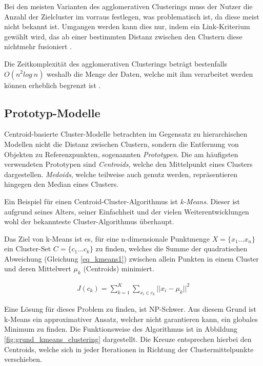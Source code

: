 Bei den meisten Varianten des agglomerativen Clusterings muss der Nutzer die Anzahl der Zielcluster im
vorraus festlegen, was problematisch ist, da diese meist nicht bekannt ist. Umgangen werden kann dies nur,
indem ein Link-Kriterium gewählt wird, das ab einer bestimmten Distanz zwischen den Clustern diese nichtmehr
fusioniert \cite[]{GeorgeSeif2018}.

Die Zeitkomplexität des agglomerativen Clusterings beträgt bestenfalls $O(n^2log\ n)$ weshalb die Menge der Daten,
welche mit ihm verarbeitet werden können erheblich begrenzt ist \cite[]{tan2007introduction}.

\subsection{Prototyp-Modelle}
\label{sec:grund_prototype_clustering}

Centroid-basierte Cluster-Modelle betrachten im Gegensatz zu hierarchischen Modellen nicht die Distanz
zwischen Clustern, sondern die Entfernung von Objekten zu Referenzpunkten, sogenannten \textit{Prototypen}.
Die am häufigsten verwendeten Prototypen sind \textit{Centroids}, welche den Mittelpunkt eines Clusters dargestellen.
\textit{Medoids}, welche teilweise auch genutz werden, repräsentieren hingegen den Median eines Clusters.

Ein Beispiel für einen Centroid-Cluster-Algorithmus ist \textit{k-Means}. Dieser ist aufgrund seines Alters,
seiner Einfachheit und der vielen Weiterentwicklungen wohl der bekannteste Cluster-Algorithmus überhaupt.

Das Ziel von k-Means ist es, für eine n-dimensionale Punktmenge $X = \{ x_1 ... x_n \}$ ein Cluster-Set $C = \{ c_1 ... c_k \}$
zu finden, welches die Summe der quadratischen Abweichung (Gleichung \ref{eq_kmeans1}) zwischen allein Punkten in einem Cluster und deren
Mittelwert $\mu_k$ (Centroids) minimiert.

\begin{ceqn}
\begin{align}
    \label{eq_kmeans1}
    J(c_k) = \sum_{k=1}^K \sum_{x_i \in c_k} || x_i - \mu_k ||^2
\end{align}
\end{ceqn}

Eine Lösung für dieses Problem zu finden, ist NP-Schwer. Aus diesem Grund
ist k-Means ein approximativer Ansatz, welcher nicht garantieren kann, ein globales Minimum zu finden.
Die Funktionsweise des Algorithmus ist in Abbildung \ref{fig:grund_kmeans_clustering} dargestellt.
Die Kreuze entsprechen hierbei den Centroids, welche sich in jeder Iterationen in Richtung der
Clustermittelpunkte verschieben.

